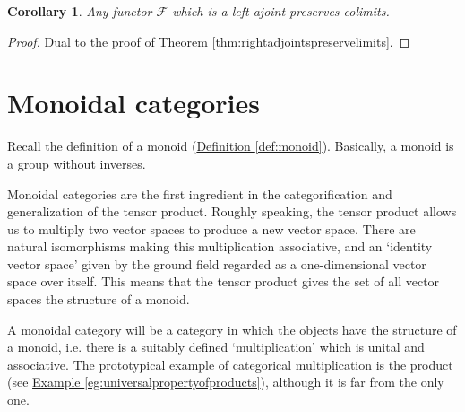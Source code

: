 \documentclass[a4paper,10pt]{scrreprt}
\theoremstyle{definition}
\theoremstyle{plain}
\newtheorem{corollary}{Corollary}[section]
\theoremstyle{remark}
\begin{document}
\begin{corollary}
  \label{cor:leftadjointspreservecolimits}
  Any functor $\mathcal{F}$ which is a left-ajoint preserves colimits.
\end{corollary}
\begin{proof}
  Dual to the proof of \hyperref[thm:rightadjointspreservelimits]{Theorem \ref*{thm:rightadjointspreservelimits}}.
\end{proof}

\section{Monoidal categories} \label{sec:monoidalcategories}
Recall the definition of a monoid (\hyperref[def:monoid]{Definition \ref*{def:monoid}}). Basically, a monoid is a group without inverses. 

Monoidal categories are the first ingredient in the categorification and generalization of the tensor product. Roughly speaking, the tensor product allows us to multiply two vector spaces to produce a new vector space. There are natural isomorphisms making this multiplication associative, and an `identity vector space' given by the ground field regarded as a one-dimensional vector space over itself. This means that the tensor product gives the set of all vector spaces the structure of a monoid.

A monoidal category will be a category in which the objects have the structure of a monoid, i.e. there is a suitably defined `multiplication' which is unital and associative. The prototypical example of categorical multiplication is the product (see \hyperref[eg:universalpropertyofproducts]{Example \ref*{eg:universalpropertyofproducts}}), although it is far from the only one.
\end{document}
